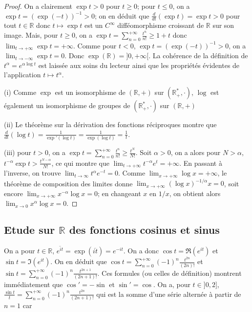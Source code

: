 \begin{proof}
On a clairement $\exp t > 0$ pour $t \geq 0$; pour $t \leq 0$, on a $\exp t = (\exp(-t))^{-1} > 0$; on en déduit que $\frac{d}{dt}(\exp t) = \exp t > 0$ pour tout $t \in \mathbb{R}$ donc $t \mapsto \exp t$ est un $C^\infty$ difféomorphisme croissant de $\mathbb{R}$ sur son image. Mais, pour $t \geq 0$, on a $\exp t = \sum_{n=0}^{+\infty} \frac{t^n}{n!} \geq 1 + t$ donc $\lim_{t \rightarrow +\infty} \exp t = +\infty$. Comme pour $t < 0$, $\exp t = (\exp(-t))^{-1} > 0$, on a $\lim_{t \rightarrow -\infty} \exp t = 0$. Donc $\exp(\mathbb{R}) = ]0,+\infty[$. La cohérence de la définition de $t^\alpha = e^{\alpha \log t}$ est laissée aux soins du lecteur ainsi que les propriétés évidentes de l'application $t \mapsto t^\alpha$.

(i) Comme $\exp$ est un isomorphisme de $(\mathbb{R},+)$ sur $(\mathbb{R}^*_+,\cdot)$, $\log$ est également un isomorphisme de groupes de $(\mathbb{R}^*_+,\cdot)$ sur $(\mathbb{R},+)$

(ii) Le théorème sur la dérivation des fonctions réciproques montre que $\frac{d}{dt}(\log t) = \frac{1}{\exp'(\log t)} = \frac{1}{\exp(\log t)} = \frac{1}{t}$.

(iii) pour $t > 0$, on a $\exp t = \sum_{n=0}^{+\infty} \frac{t^n}{n!} \geq \frac{t^N}{N!}$. Soit $\alpha > 0$, on a alors pour $N > \alpha$, $t^{-\alpha} \exp t > \frac{t^{N-\alpha}}{N!}$, ce qui montre que $\lim_{t \rightarrow +\infty} t^{-\alpha} e^t = +\infty$. En passant à l'inverse, on trouve $\lim_{t \rightarrow \infty} t^\alpha e^{-t} = 0$. Comme $\lim_{x \rightarrow +\infty} \log x = +\infty$, le théorème de composition des limites donne $\lim_{x \rightarrow +\infty} (\log x)^{-1/\alpha} x = 0$, soit encore $\lim_{x \rightarrow +\infty} x^{-\alpha} \log x = 0$; en changeant $x$ en $1/x$, on obtient alors $\lim_{x \rightarrow 0} x^\alpha \log x = 0$.
\end{proof}

\subsection{Etude sur $\mathbb{R}$ des fonctions cosinus et sinus}

On a pour $t \in \mathbb{R}$, $\overline{e^{it}} = \exp(\overline{it}) = e^{-it}$. On a donc $\cos t = \Re(e^{it})$ et $\sin t = \Im(e^{it})$. On en déduit que $\cos t = \sum_{n=0}^{+\infty} (-1)^n \frac{t^{2n}}{(2n)!}$ et $\sin t = \sum_{n=0}^{+\infty} (-1)^n \frac{t^{2n+1}}{(2n+1)!}$. Ces formules (ou celles de définition) montrent immédiatement que $\cos' = -\sin$ et $\sin' = \cos$. On a, pour $t \in ]0,2]$, $\frac{\sin t}{t} = \sum_{n=0}^{+\infty} (-1)^n \frac{t^{2n}}{(2n+1)!}$ qui est la somme d'une série alternée à partir de $n = 1$ car

